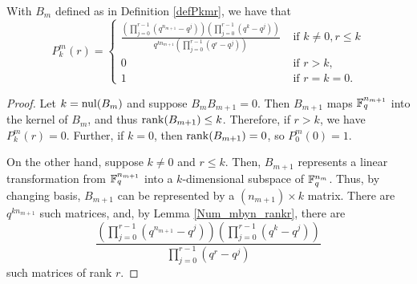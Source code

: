 \begin{lemma} With $B_m$ defined as in Definition \ref{defPkmr}, we have that
\[
P^m_k(r) = \begin{cases}
  {\displaystyle \frac{\left(\prod_{j=0}^{r-1}\left(q^{n_{m+1}}-q^{j}\right)\right)
  \left(\prod_{j=0}^{r-1}\left(q^k - q^j \right) \right)}
  {q^{kn_{m+1}} \left(\prod_{j=0}^{r-1} \left(q^r-q^j\right)\right)}}
            					& \textrm{ if } k\neq 0, r \leq k \\
           0					& \textrm{ if }  r>k,\\
           1					& \textrm{ if } r = k = 0.
            \end{cases}
\]
\end{lemma}
\begin{proof}
Let $k= \mathrm{nul}(B_{m})$ and suppose $B_mB_{m+1} = 0$.  Then $B_{m+1}$ maps $\mathbb{F}_q^{n_{m+1}}$ into the kernel of $B_m$, and thus $\operatorname{\mathrm{rank}}(B_{m+1}) \leq k$.  Therefore, if $r>k$, we have $P^m_k(r) = 0$.  Further, if $k=0$, then $\operatorname{\mathrm{rank}}(B_{m+1}) = 0$, so $P^m_0(0) = 1$.

On the other hand, suppose $k\neq 0$ and $r\leq k$.  Then, $B_{m+1}$ represents a linear transformation from $\mathbb{F}_q^{n_{m+1}}$ into a $k$-dimensional subspace of $\mathbb{F}_q^{n_{m}}$. Thus, by changing basis, $B_{m+1}$ can be represented by a $(n_{m+1}) \times k$ matrix.  There are $q^{kn_{m+1}}$ such matrices, and, by Lemma \ref{Num_mbyn_rankr}, there are 
\[
 \displaystyle \frac{\left(\prod_{j=0}^{r-1}\left(q^{n_{m+1}}-q^{j}\right)\right)
  \left(\prod_{j=0}^{r-1}\left(q^k - q^j \right) \right)}
  {\prod_{j=0}^{r-1} \left(q^r-q^j\right)}
\]
such matrices of rank $r$.

\end{proof}